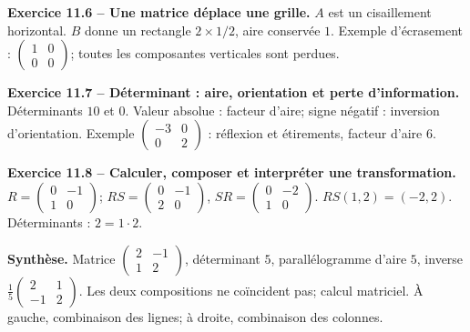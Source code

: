 \documentclass[11pt,a4paper,openany]{book}
\begin{document}
\begin{answerbox}
\textbf{Exercice 11.6 -- Une matrice déplace une grille.} $A$ est un cisaillement horizontal. $B$ donne un rectangle $2\times1/2$, aire conservée $1$. Exemple d'écrasement : $\begin{pmatrix}1&0\\0&0\end{pmatrix}$; toutes les composantes verticales sont perdues.\par
\textbf{Exercice 11.7 -- Déterminant : aire, orientation et perte d'information.} Déterminants $10$ et $0$. Valeur absolue : facteur d'aire; signe négatif : inversion d'orientation. Exemple $\begin{pmatrix}-3&0\\0&2\end{pmatrix}$ : réflexion et étirements, facteur d'aire $6$.\par
\textbf{Exercice 11.8 -- Calculer, composer et interpréter une transformation.} $R=\begin{pmatrix}0&-1\\1&0\end{pmatrix}$; $RS=\begin{pmatrix}0&-1\\2&0\end{pmatrix}$, $SR=\begin{pmatrix}0&-2\\1&0\end{pmatrix}$. $RS(1,2)=(-2,2)$. Déterminants : $2=1\cdot2$.\par
\medskip\textbf{Synthèse.} Matrice $\begin{pmatrix}2&-1\\1&2\end{pmatrix}$, déterminant $5$, parallélogramme d'aire $5$, inverse $\frac15\begin{pmatrix}2&1\\-1&2\end{pmatrix}$. Les deux compositions ne coïncident pas; calcul matriciel. À gauche, combinaison des lignes; à droite, combinaison des colonnes.
\end{answerbox}
\end{document}
